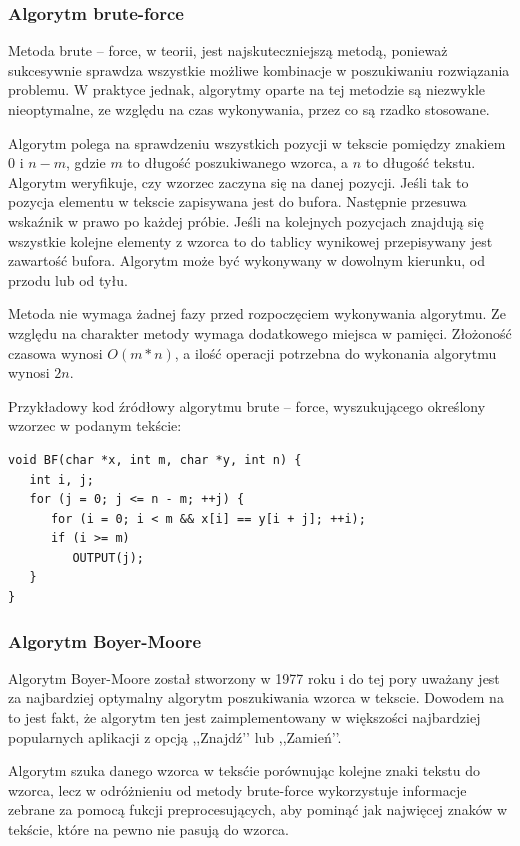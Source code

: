 \documentclass[a4paper,12pt]{article}
\begin{document}
\subsubsection{Algorytm brute-force}

Metoda brute -- force, w teorii, jest najskuteczniejszą metodą, ponieważ sukcesywnie sprawdza wszystkie możliwe kombinacje w poszukiwaniu rozwiązania problemu. W praktyce jednak, algorytmy oparte na tej metodzie są niezwykle nieoptymalne, ze względu na czas wykonywania, przez co są rzadko stosowane.

Algorytm polega na sprawdzeniu wszystkich pozycji w tekscie pomiędzy znakiem $0$ i $n-m$, gdzie $m$ to długość poszukiwanego wzorca, a $n$ to długość tekstu. Algorytm weryfikuje, czy wzorzec zaczyna się na danej pozycji. Jeśli tak to pozycja elementu w tekscie zapisywana jest do bufora. Następnie przesuwa wskaźnik w prawo po każdej próbie. Jeśli na kolejnych pozycjach znajdują się wszystkie kolejne elementy z wzorca to do tablicy wynikowej przepisywany jest zawartość bufora. Algorytm może być wykonywany w dowolnym kierunku, od przodu lub od tyłu.

Metoda nie wymaga żadnej fazy przed rozpoczęciem wykonywania algorytmu. Ze względu na charakter metody wymaga dodatkowego miejsca w pamięci. Złożoność czasowa wynosi $O(m*n)$, a ilość operacji potrzebna do wykonania algorytmu wynosi $2n$.

\pagebreak

Przykładowy kod źródłowy algorytmu brute -- force, wyszukującego określony wzorzec w podanym tekście:
\begin{lstlisting}
void BF(char *x, int m, char *y, int n) {
   int i, j;
   for (j = 0; j <= n - m; ++j) {
      for (i = 0; i < m && x[i] == y[i + j]; ++i);
      if (i >= m)
         OUTPUT(j);
   }
}
\end{lstlisting}

\newpage

\subsubsection{Algorytm Boyer-Moore}

Algorytm Boyer-Moore został stworzony w 1977 roku i do tej pory uważany jest za najbardziej optymalny algorytm poszukiwania wzorca w tekscie. Dowodem na to jest fakt, że algorytm ten jest zaimplementowany w większości najbardziej popularnych aplikacji z opcją ,,Znajdź’’ lub ,,Zamień’’.

Algorytm szuka danego wzorca w teksćie porównując kolejne znaki tekstu do wzorca, lecz w odróżnieniu od metody brute-force wykorzystuje informacje zebrane za pomocą fukcji preprocesujących, aby pominąć jak najwięcej znaków w tekście, które na pewno nie pasują do wzorca.
\end{document}
